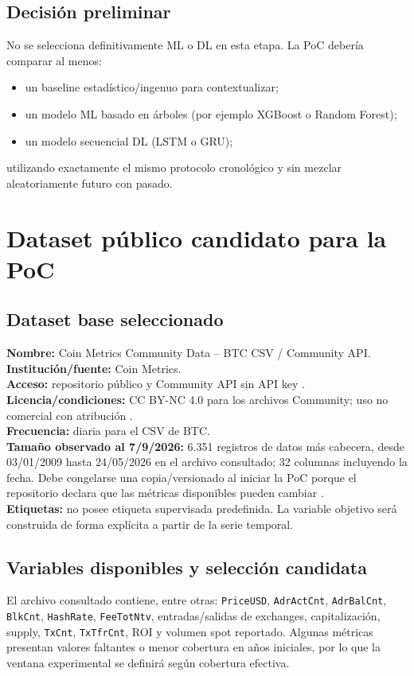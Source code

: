 \documentclass[11pt,letterpaper]{article}
\begin{document}
\subsection{Decisión preliminar}
No se selecciona definitivamente ML o DL en esta etapa. La PoC debería comparar al menos:
\begin{itemize}
  \item un baseline estadístico/ingenuo para contextualizar;
  \item un modelo ML basado en árboles (por ejemplo XGBoost o Random Forest);
  \item un modelo secuencial DL (LSTM o GRU);
\end{itemize}
utilizando exactamente el mismo protocolo cronológico y sin mezclar aleatoriamente futuro con pasado.

\section{Dataset público candidato para la PoC}

\subsection{Dataset base seleccionado}
\textbf{Nombre:} Coin Metrics Community Data -- BTC CSV / Community API.\\
\textbf{Institución/fuente:} Coin Metrics.\\
\textbf{Acceso:} repositorio público y Community API sin API key \parencite{coinmetricsrepo,coinmetricsapi}.\\
\textbf{Licencia/condiciones:} CC BY-NC 4.0 para los archivos Community; uso no comercial con atribución \parencite{coinmetricsrepo}.\\
\textbf{Frecuencia:} diaria para el CSV de BTC.\\
\textbf{Tamaño observado al 7/9/2026:} 6.351 registros de datos más cabecera, desde 03/01/2009 hasta 24/05/2026 en el archivo consultado; 32 columnas incluyendo la fecha. Debe congelarse una copia/versionado al iniciar la PoC porque el repositorio declara que las métricas disponibles pueden cambiar \parencite{coinmetricsbtc,coinmetricsrepo}.\\
\textbf{Etiquetas:} no posee etiqueta supervisada predefinida. La variable objetivo será construida de forma explícita a partir de la serie temporal.

\subsection{Variables disponibles y selección candidata}
El archivo consultado contiene, entre otras: \texttt{PriceUSD}, \texttt{AdrActCnt}, \texttt{AdrBalCnt}, \texttt{BlkCnt}, \texttt{HashRate}, \texttt{FeeTotNtv}, entradas/salidas de exchanges, capitalización, supply, \texttt{TxCnt}, \texttt{TxTfrCnt}, ROI y volumen spot reportado. Algunas métricas presentan valores faltantes o menor cobertura en años iniciales, por lo que la ventana experimental se definirá según cobertura efectiva.
\end{document}
